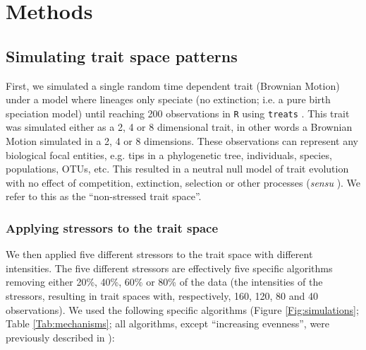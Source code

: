 \documentclass[12pt,letterpaper]{article}
\begin{document}
\section{Methods}
\subsection{Simulating trait space patterns}

First, we simulated a single random time dependent trait (Brownian Motion) under a model where lineages only speciate (no extinction; i.e. a pure birth speciation model) until reaching 200 observations in \texttt{R} \citep{rcore} using \texttt{treats} \citep{guillerme2024treats}.
This trait was simulated either as a 2, 4 or 8 dimensional trait, in other words a Brownian Motion simulated in a 2, 4 or 8 dimensions.
These observations can represent any biological focal entities, e.g. tips in a phylogenetic tree, individuals, species, populations, OTUs, etc. %
This resulted in a neutral null model of trait evolution with no effect of competition, extinction, selection or other processes (\textit{sensu} \citealt{bausman2018modeling}).
We refer to this as the ``non-stressed trait space''.

\subsubsection{Applying stressors to the trait space}

We then applied five different stressors to the trait space with different intensities.
The five different stressors are effectively five specific algorithms removing either 20\%, 40\%, 60\% or 80\% of the data (the intensities of the stressors, resulting in trait spaces with, respectively, 160, 120, 80 and 40 observations).
We used the following specific algorithms (Figure \ref{Fig:simulations}; Table \ref{Tab:mechanisms}; all algorithms, except ``increasing evenness'', were previously described in \cite{guillerme2020shifting}):
\end{document}
